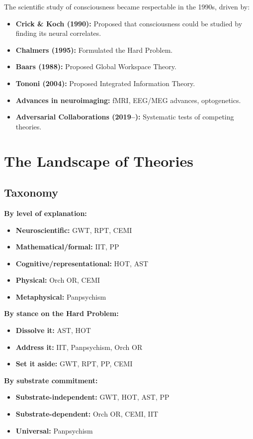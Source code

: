 \documentclass[11pt,a4paper]{report}
\begin{document}
The scientific study of consciousness became respectable in the 1990s, driven by:
\begin{itemize}[leftmargin=1.5em]
  \item \textbf{Crick \& Koch (1990):} Proposed that consciousness could be studied by finding its neural correlates.
  \item \textbf{Chalmers (1995):} Formulated the Hard Problem.
  \item \textbf{Baars (1988):} Proposed Global Workspace Theory.
  \item \textbf{Tononi (2004):} Proposed Integrated Information Theory.
  \item \textbf{Advances in neuroimaging:} fMRI, EEG/MEG advances, optogenetics.
  \item \textbf{Adversarial Collaborations (2019--):} Systematic tests of competing theories.
\end{itemize}


\chapter{The Landscape of Theories}

\section{Taxonomy}

\begin{principlebox}
\textbf{By level of explanation:}
\begin{itemize}[leftmargin=1.5em]
  \item \textbf{Neuroscientific:} GWT, RPT, CEMI
  \item \textbf{Mathematical/formal:} IIT, PP
  \item \textbf{Cognitive/representational:} HOT, AST
  \item \textbf{Physical:} Orch OR, CEMI
  \item \textbf{Metaphysical:} Panpsychism
\end{itemize}

\textbf{By stance on the Hard Problem:}
\begin{itemize}[leftmargin=1.5em]
  \item \textbf{Dissolve it:} AST, HOT
  \item \textbf{Address it:} IIT, Panpsychism, Orch OR
  \item \textbf{Set it aside:} GWT, RPT, PP, CEMI
\end{itemize}

\textbf{By substrate commitment:}
\begin{itemize}[leftmargin=1.5em]
  \item \textbf{Substrate-independent:} GWT, HOT, AST, PP
  \item \textbf{Substrate-dependent:} Orch OR, CEMI, IIT
  \item \textbf{Universal:} Panpsychism
\end{itemize}
\end{principlebox}
\end{document}
